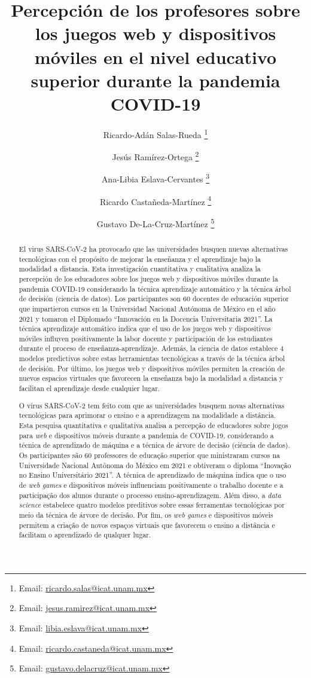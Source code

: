 \documentclass[spanish]{textolivre}
\title{Percepción de los profesores sobre los juegos web y dispositivos móviles en el nivel educativo superior durante la pandemia COVID-19}
\author[1]{Ricardo-Adán Salas-Rueda \orcid{0000-0002-4188-4610} \thanks{Email: \url{ricardo.salas@icat.unam.mx}}}
\author[1]{Jesús Ramírez-Ortega \orcid{0000-0002-4538-9203} \thanks{Email: \url{jesus.ramirez@icat.unam.mx}}}
\author[1]{Ana-Libia Eslava-Cervantes \orcid{0000-0002-7420-3412} \thanks{Email: \url{libia.eslava@icat.unam.mx}}}
\author[1]{Ricardo Castañeda-Martínez \orcid{0000-0002-2225-7136} \thanks{Email: \url{ricardo.castaneda@icat.unam.mx}}}
\author[1]{Gustavo De-La-Cruz-Martínez \orcid{0000-0002-4446-7396} \thanks{Email: \url{gustavo.delacruz@icat.unam.mx}}}
\affil[1]{Universidad Nacional Autónoma de México, Instituto de Ciencias Aplicadas y Tecnología, Ciudad de México, México.}
\begin{document}
\maketitle

\begin{polyabstract}
\begin{abstract}
El virus SARS-CoV-2 ha provocado que las universidades busquen nuevas alternativas tecnológicas con el propósito de mejorar la enseñanza y el aprendizaje bajo la modalidad a distancia. Esta investigación cuantitativa y cualitativa analiza la percepción de los educadores sobre los juegos web y dispositivos móviles durante la pandemia COVID-19 considerando la técnica aprendizaje automático y la técnica árbol de decisión (ciencia de datos). Los participantes son 60 docentes de educación superior que impartieron cursos en la Universidad Nacional Autónoma de México en el año 2021 y tomaron el Diplomado “Innovación en la Docencia Universitaria 2021”. La técnica aprendizaje automático indica que el uso de los juegos web y dispositivos móviles influyen positivamente la labor docente y participación de los estudiantes durante el proceso de enseñanza-aprendizaje. Además, la ciencia de datos establece 4 modelos predictivos sobre estas herramientas tecnológicas a través de la técnica árbol de decisión. Por último, los juegos web y dispositivos móviles permiten la creación de nuevos espacios virtuales que favorecen la enseñanza bajo la modalidad a distancia y facilitan el aprendizaje desde cualquier lugar.

\end{abstract}

\begin{portuguese}
\begin{abstract}
O vírus SARS-CoV-2 tem feito com que as universidades busquem novas alternativas tecnológicas para aprimorar o ensino e a aprendizagem na modalidade a distância. Esta pesquisa quantitativa e qualitativa analisa a percepção de educadores sobre jogos para \textit{web} e dispositivos móveis durante a pandemia de COVID-19, considerando a técnica de aprendizado de máquina e a técnica de árvore de decisão (ciência de dados). Os participantes são 60 professores de educação superior que ministraram cursos na Universidade Nacional Autônoma do México em 2021 e obtiveram o diploma “Inovação no Ensino Universitário 2021”. A técnica de aprendizado de máquina indica que o uso de \textit{web games} e dispositivos móveis influenciam positivamente o trabalho docente e a participação dos alunos durante o processo ensino-aprendizagem. Além disso, a \textit{data science} estabelece quatro modelos preditivos sobre essas ferramentas tecnológicas por meio da técnica de árvore de decisão. Por fim, os \textit{web games} e dispositivos móveis permitem a criação de novos espaços virtuais que favorecem o ensino a distância e facilitam o aprendizado de qualquer lugar.


\end{abstract}
\end{portuguese}
\end{polyabstract}
\end{document}
